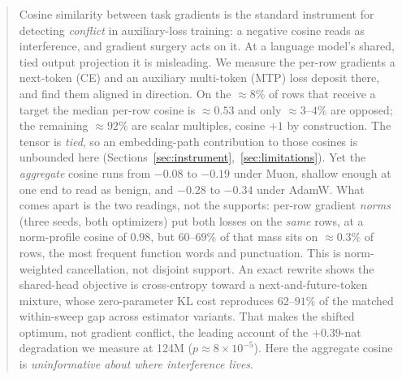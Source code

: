 \begin{abstract}
Cosine similarity between task gradients is the standard instrument for detecting
\emph{conflict} in auxiliary-loss training: a negative cosine reads as
interference, and gradient surgery acts on it. At a language model's shared,
tied output projection it is misleading. We measure the per-row gradients a
next-token (CE) and an auxiliary multi-token (MTP) loss deposit there, and find
them aligned in direction. On the ${\approx}8\%$ of rows that receive a target
the median per-row cosine is ${\approx}0.53$ and only ${\approx}3$--$4\%$ are
opposed; the remaining ${\approx}92\%$ are scalar multiples, cosine $+1$ by
construction. The tensor is \emph{tied}, so an embedding-path contribution to
those cosines is unbounded here (Sections~\ref{sec:instrument},~\ref{sec:limitations}).
Yet the \emph{aggregate} cosine runs from ${-}0.08$ to ${-}0.19$ under Muon,
shallow enough at one end to read as benign, and ${-}0.28$ to ${-}0.34$ under
AdamW. What comes apart is the two readings, not the supports: per-row gradient
\emph{norms} (three seeds, both optimizers) put both losses on the \emph{same}
rows, at a norm-profile cosine of $0.98$, but $60$--$69\%$ of that mass sits on
${\approx}0.3\%$ of rows, the most frequent function words and punctuation. This
is norm-weighted cancellation, not disjoint support.
An exact rewrite shows the shared-head objective is cross-entropy toward a
next-and-future-token mixture, whose zero-parameter KL cost reproduces
$62$--$91\%$ of the matched within-sweep gap across estimator variants. That
makes the shifted optimum, not gradient conflict, the leading account of the
$+0.39$-nat degradation we measure at 124M ($p{\approx}8{\times}10^{-5}$). Here
the aggregate cosine is \emph{uninformative about where interference lives}.
\end{abstract}

